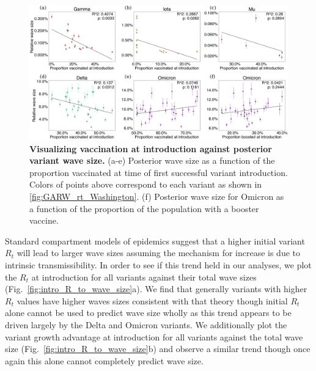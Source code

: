 \documentclass[11pt,oneside,letterpaper]{article}
\def\tbc#1{\textcolor{purple}{[#1]}}
\def\mfc#1{\textcolor{brown}{[#1]}}
\begin{document}
\begin{figure}[h!]
  \centering
  \includegraphics[width=\linewidth]{figs/vaccination_to_wave_size.png}
  \caption{\textbf{Visualizing vaccination at introduction against posterior variant wave size.}
  (a-e) Posterior wave size as a function of the proportion vaccinated at time of first successful variant introduction. Colors of points above correspond to each variant as shown in \ref{fig:GARW_rt_Washington}.
  (f) Posterior wave size for Omicron as a function of the proportion of the population with a booster vaccine.
}
  \label{fig:vaccination_to_wave_size}
\end{figure}

Standard compartment models of epidemics suggest that a higher initial variant $R_{t}$ will lead to larger wave sizes assuming the mechanism for increase is due to intrinsic transmissibility.
In order to see if this trend held in our analyses, we plot the $R_{t}$ at introduction for all variants against their total wave sizes (Fig.\ \ref{fig:intro_R_to_wave_size}a).
We find that generally variants with higher $R_{t}$ values have higher waves sizes consistent with that theory though initial $R_{t}$ alone cannot be used to predict wave size wholly as this trend appears to be driven largely by the Delta and Omicron variants.
We additionally plot the variant growth advantage at introduction for all variants against the total wave size (Fig.\ \ref{fig:intro_R_to_wave_size}b) and observe a similar trend though once again this alone cannot completely predict wave size.
\end{document}
